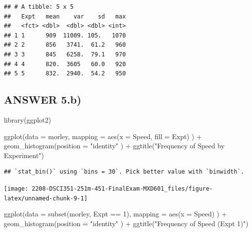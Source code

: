 \documentclass[
]{article}
\newenvironment{Shaded}{\begin{snugshade}}{\end{snugshade}}
\newcommand{\AttributeTok}[1]{\textcolor[rgb]{0.77,0.63,0.00}{#1}}
\newcommand{\DecValTok}[1]{\textcolor[rgb]{0.00,0.00,0.81}{#1}}
\newcommand{\FunctionTok}[1]{\textcolor[rgb]{0.00,0.00,0.00}{#1}}
\newcommand{\NormalTok}[1]{#1}
\newcommand{\SpecialCharTok}[1]{\textcolor[rgb]{0.00,0.00,0.00}{#1}}
\newcommand{\StringTok}[1]{\textcolor[rgb]{0.31,0.60,0.02}{#1}}
\begin{document}
\begin{verbatim}
## # A tibble: 5 x 5
##   Expt   mean    var    sd   max
##   <fct> <dbl>  <dbl> <dbl> <int>
## 1 1      909  11009. 105.   1070
## 2 2      856   3741.  61.2   960
## 3 3      845   6258.  79.1   970
## 4 4      820.  3605   60.0   920
## 5 5      832.  2940.  54.2   950
\end{verbatim}

\hypertarget{answer-5.b}{%
\subsection{ANSWER 5.b)}\label{answer-5.b}}

\begin{Shaded}
\begin{Highlighting}[]
\FunctionTok{library}\NormalTok{(ggplot2)}

\FunctionTok{ggplot}\NormalTok{(}\AttributeTok{data =}\NormalTok{ morley,}
       \AttributeTok{mapping =} \FunctionTok{aes}\NormalTok{(}\AttributeTok{x =}\NormalTok{ Speed, }\AttributeTok{fill =}\NormalTok{ Expt)}
\NormalTok{       ) }\SpecialCharTok{+} \FunctionTok{geom\_histogram}\NormalTok{(}\AttributeTok{position =} \StringTok{"identity"}
\NormalTok{       ) }\SpecialCharTok{+} \FunctionTok{ggtitle}\NormalTok{(}\StringTok{"Frequency of Speed by Experiment"}\NormalTok{)}
\end{Highlighting}
\end{Shaded}

\begin{verbatim}
## `stat_bin()` using `bins = 30`. Pick better value with `binwidth`.
\end{verbatim}

\begin{center}\texttt{[image: 2208-DSCI351-251m-451-FinalExam-MXD601\_files/figure-latex/unnamed-chunk-9-1]} \end{center}

\begin{Shaded}
\begin{Highlighting}[]
\FunctionTok{ggplot}\NormalTok{(}\AttributeTok{data =} \FunctionTok{subset}\NormalTok{(morley, Expt }\SpecialCharTok{==} \DecValTok{1}\NormalTok{),}
       \AttributeTok{mapping =} \FunctionTok{aes}\NormalTok{(}\AttributeTok{x =}\NormalTok{ Speed)}
\NormalTok{       ) }\SpecialCharTok{+} \FunctionTok{geom\_histogram}\NormalTok{(}\AttributeTok{position =} \StringTok{"identity"}
\NormalTok{       ) }\SpecialCharTok{+} \FunctionTok{ggtitle}\NormalTok{(}\StringTok{"Frequency of Speed (Expt 1)"}\NormalTok{)}
\end{Highlighting}
\end{Shaded}
\end{document}
